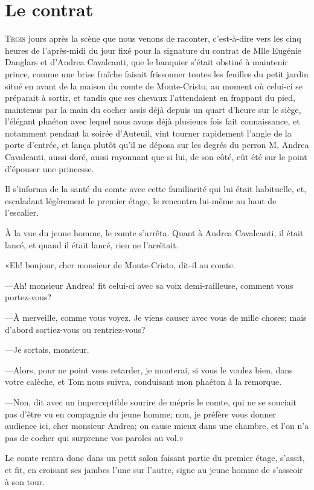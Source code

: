 \chapter{Le contrat}

\lettrine{T}{rois} jours après la scène que nous venons de raconter, c'est-à-dire vers les cinq heures de l'après-midi du jour fixé pour la signature du contrat de Mlle Eugénie Danglars et d'Andrea Cavalcanti, que le banquier s'était obstiné à maintenir prince, comme une brise fraîche faisait frissonner toutes les feuilles du petit jardin situé en avant de la maison du comte de Monte-Cristo, au moment où celui-ci se préparait à sortir, et tandis que ses chevaux l'attendaient en frappant du pied, maintenus par la main du cocher assis déjà depuis un quart d'heure sur le siège, l'élégant phaéton avec lequel nous avons déjà plusieurs fois fait connaissance, et notamment pendant la soirée d'Auteuil, vint tourner rapidement l'angle de la porte d'entrée, et lança plutôt qu'il ne déposa sur les degrés du perron M. Andrea Cavalcanti, aussi doré, aussi rayonnant que si lui, de son côté, eût été sur le point d'épouser une princesse. 

Il s'informa de la santé du comte avec cette familiarité qui lui était habituelle, et, escaladant légèrement le premier étage, le rencontra lui-même au haut de l'escalier. 

À la vue du jeune homme, le comte s'arrêta. Quant à Andrea Cavalcanti, il était lancé, et quand il était lancé, rien ne l'arrêtait. 

«Eh! bonjour, cher monsieur de Monte-Cristo, dit-il au comte. 

—Ah! monsieur Andrea! fit celui-ci avec sa voix demi-railleuse, comment vous portez-vous? 

—À merveille, comme vous voyez. Je viens causer avec vous de mille choses; mais d'abord sortiez-vous ou rentriez-vous? 

—Je sortais, monsieur. 

—Alors, pour ne point vous retarder, je monterai, si vous le voulez bien, dans votre calèche, et Tom nous suivra, conduisant mon phaéton à la remorque. 

—Non, dit avec un imperceptible sourire de mépris le comte, qui ne se souciait pas d'être vu en compagnie du jeune homme; non, je préfère vous donner audience ici, cher monsieur Andrea; on cause mieux dans une chambre, et l'on n'a pas de cocher qui surprenne vos paroles au vol.» 

Le comte rentra donc dans un petit salon faisant partie du premier étage, s'assit, et fit, en croisant ses jambes l'une sur l'autre, signe au jeune homme de s'asseoir à son tour. 

